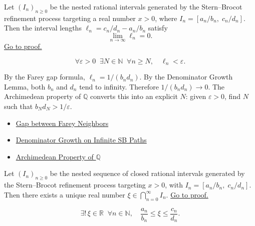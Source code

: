 \begin{lemma}
\label{lem:sb-length-zero}
Let $(I_n)_{n \geq 0}$ be the nested rational intervals generated by
the Stern--Brocot refinement process targeting a real number $x > 0$,
where $I_n = [a_n/b_n,\; c_n/d_n]$.  Then the interval lengths
$\ell_n = c_n/d_n - a_n/b_n$ satisfy
\[
\lim_{n \to \infty} \ell_n = 0.
\]
\hyperref[prf:sb-length-zero]{Go to proof.}
\end{lemma}

\begin{remark*}
\[
\forall \varepsilon > 0\;\;
\exists N \in \mathbb{N}\;\;
\forall n \geq N,\quad
\ell_n < \varepsilon.
\]
\end{remark*}

\begin{remark*}[Interpretation]
By the Farey gap formula, $\ell_n = 1/(b_n d_n)$.
By the Denominator Growth Lemma, both $b_n$ and $d_n$ tend to infinity.
Therefore $1/(b_n d_n) \to 0$.  The Archimedean property of $\mathbb{Q}$
converts this into an explicit $N$: given $\varepsilon > 0$, find $N$
such that $b_N d_N > 1/\varepsilon$.
\end{remark*}

\begin{dependencies}
\begin{itemize}
  \item \hyperref[thm:farey-gap]{Gap between Farey Neighbors}
  \item \hyperref[lem:sb-denom-growth]{Denominator Growth on Infinite SB Paths}
  \item \hyperref[thm:archimedean-q]{Archimedean Property of $\mathbb{Q}$}
\end{itemize}
\end{dependencies}

\begin{proposition}
\label{prop:sb-unique-point}
Let $(I_n)_{n \geq 0}$ be the nested sequence of closed rational intervals
generated by the Stern--Brocot refinement process targeting $x > 0$,
with $I_n = [a_n/b_n,\; c_n/d_n]$.  Then there exists a unique real
number $\xi \in \bigcap_{n=0}^{\infty} I_n$.
\hyperref[prf:sb-unique-point]{Go to proof.}
\end{proposition}

\begin{remark*}
\[
\exists!\, \xi \in \mathbb{R}\;\;
\forall n \in \mathbb{N},\quad
\frac{a_n}{b_n} \leq \xi \leq \frac{c_n}{d_n}.
\]
\end{remark*}

